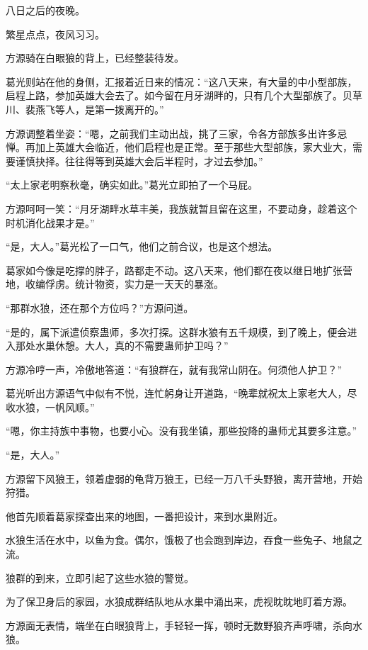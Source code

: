 
\begin{this_body}

八日之后的夜晚。

繁星点点，夜风习习。

方源骑在白眼狼的背上，已经整装待发。

葛光则站在他的身侧，汇报着近日来的情况：“这八天来，有大量的中小型部族，启程上路，参加英雄大会去了。如今留在月牙湖畔的，只有几个大型部族了。贝草川、裴燕飞等人，是第一拨离开的。”

方源调整着坐姿：“嗯，之前我们主动出战，挑了三家，令各方部族多出许多忌惮。再加上英雄大会临近，他们启程也是正常。至于那些大型部族，家大业大，需要谨慎抉择。往往得等到英雄大会后半程时，才过去参加。”

“太上家老明察秋毫，确实如此。”葛光立即拍了一个马屁。

方源呵呵一笑：“月牙湖畔水草丰美，我族就暂且留在这里，不要动身，趁着这个时机消化战果才是。”

“是，大人。”葛光松了一口气，他们之前合议，也是这个想法。

葛家如今像是吃撑的胖子，路都走不动。这八天来，他们都在夜以继日地扩张营地，收编俘虏。统计物资，实力是一天天的暴涨。

“那群水狼，还在那个方位吗？”方源问道。

“是的，属下派遣侦察蛊师，多次打探。这群水狼有五千规模，到了晚上，便会进入那处水巢休憩。大人，真的不需要蛊师护卫吗？”

方源冷哼一声，冷傲地答道：“有狼群在，就有我常山阴在。何须他人护卫？”

葛光听出方源语气中似有不悦，连忙躬身让开道路，“晚辈就祝太上家老大人，尽收水狼，一帆风顺。”

“嗯，你主持族中事物，也要小心。没有我坐镇，那些投降的蛊师尤其要多注意。”

“是，大人。”

方源留下风狼王，领着虚弱的龟背万狼王，已经一万八千头野狼，离开营地，开始狩猎。

他首先顺着葛家探查出来的地图，一番把设计，来到水巢附近。

水狼生活在水中，以鱼为食。偶尔，饿极了也会跑到岸边，吞食一些兔子、地鼠之流。

狼群的到来，立即引起了这些水狼的警觉。

为了保卫身后的家园，水狼成群结队地从水巢中涌出来，虎视眈眈地盯着方源。

方源面无表情，端坐在白眼狼背上，手轻轻一挥，顿时无数野狼齐声呼啸，杀向水狼。


\end{this_body}
